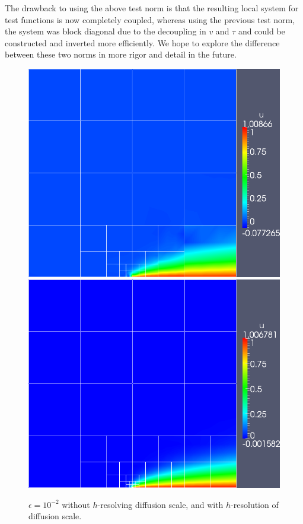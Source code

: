 \documentclass[letterpaper]{article}
\begin{document}
The drawback to using the above test norm is that the resulting local system
for test functions is now completely coupled, whereas using the previous test
norm, the system was block diagonal due to the decoupling in $v$ and $\tau$
and could be constructed and inverted more efficiently.  We hope to explore
the difference between these two norms in more rigor and detail in the
future.  

\begin{figure}[!h]
\centering
\includegraphics[scale=.275]{figs/LaplaceFigs/coupled1e2h1e2.png}
\includegraphics[scale=.275]{figs/LaplaceFigs/coupled1e2h1e3.png}
\caption{$\epsilon = 10^{-2}$ without $h$-resolving diffusion scale, and with $h$-resolution of diffusion scale.}
\label{fig:newNorm}
\end{figure}
\end{document}
